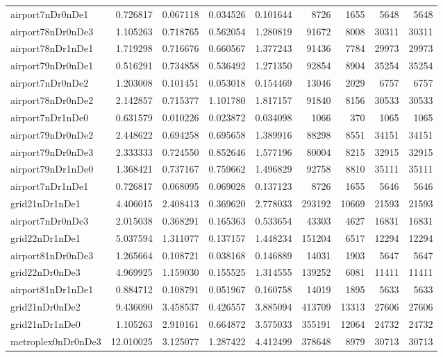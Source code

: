 \documentclass[../../../thesis.tex]{subfiles}
\begin{document}
\begin{longtable}{|l|r|r|r|r|r|r|r|r|}
airport7nDr0nDe1 & 0.726817 & 0.067118 & 0.034526 & 0.101644 & 8726 & 1655 & 5648 & 5648 \\
airport78nDr0nDe3 & 1.105263 & 0.718765 & 0.562054 & 1.280819 & 91672 & 8008 & 30311 & 30311 \\
airport78nDr1nDe1 & 1.719298 & 0.716676 & 0.660567 & 1.377243 & 91436 & 7784 & 29973 & 29973 \\
airport79nDr0nDe1 & 0.516291 & 0.734858 & 0.536492 & 1.271350 & 92854 & 8904 & 35254 & 35254 \\
airport7nDr0nDe2 & 1.203008 & 0.101451 & 0.053018 & 0.154469 & 13046 & 2029 & 6757 & 6757 \\
airport78nDr0nDe2 & 2.142857 & 0.715377 & 1.101780 & 1.817157 & 91840 & 8156 & 30533 & 30533 \\
airport7nDr1nDe0 & 0.631579 & 0.010226 & 0.023872 & 0.034098 & 1066 & 370 & 1065 & 1065 \\
airport79nDr0nDe2 & 2.448622 & 0.694258 & 0.695658 & 1.389916 & 88298 & 8551 & 34151 & 34151 \\
airport79nDr0nDe3 & 2.333333 & 0.724550 & 0.852646 & 1.577196 & 80004 & 8215 & 32915 & 32915 \\
airport79nDr1nDe0 & 1.368421 & 0.737167 & 0.759662 & 1.496829 & 92758 & 8810 & 35111 & 35111 \\
airport7nDr1nDe1 & 0.726817 & 0.068095 & 0.069028 & 0.137123 & 8726 & 1655 & 5646 & 5646 \\
grid21nDr1nDe1 & 4.406015 & 2.408413 & 0.369620 & 2.778033 & 293192 & 10669 & 21593 & 21593 \\
airport7nDr0nDe3 & 2.015038 & 0.368291 & 0.165363 & 0.533654 & 43303 & 4627 & 16831 & 16831 \\
grid22nDr1nDe1 & 5.037594 & 1.311077 & 0.137157 & 1.448234 & 151204 & 6517 & 12294 & 12294 \\
airport81nDr0nDe3 & 1.265664 & 0.108721 & 0.038168 & 0.146889 & 14031 & 1903 & 5647 & 5647 \\
grid22nDr0nDe3 & 4.969925 & 1.159030 & 0.155525 & 1.314555 & 139252 & 6081 & 11411 & 11411 \\
airport81nDr1nDe1 & 0.884712 & 0.108791 & 0.051967 & 0.160758 & 14019 & 1895 & 5633 & 5633 \\
grid21nDr0nDe2 & 9.436090 & 3.458537 & 0.426557 & 3.885094 & 413709 & 13313 & 27606 & 27606 \\
grid21nDr1nDe0 & 1.105263 & 2.910161 & 0.664872 & 3.575033 & 355191 & 12064 & 24732 & 24732 \\
metroplex0nDr0nDe3 & 12.010025 & 3.125077 & 1.287422 & 4.412499 & 378648 & 8979 & 30713 & 30713 \\

\end{longtable}
\end{document}
